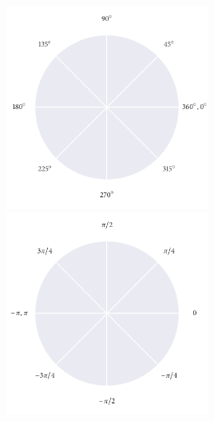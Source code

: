 \documentclass[12pt]{beamer}
\begin{document}
\begin{frame}
  \vspace{0.85cm}
  \centering
  \includegraphics[width=0.5\textwidth]{degree_axes.pdf}%
  \includegraphics[width=0.5\textwidth]{radian_axes.pdf}
\end{frame}
\end{document}
